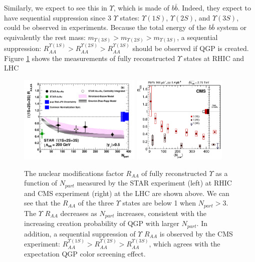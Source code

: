 Similarly, we expect to see this in $\Upsilon$, which is made of $b \bar b$. Indeed, they expect to have sequential suppression since 3 $\Upsilon$ states: $\Upsilon(1S)$,  $\Upsilon(2S)$, and $\Upsilon(3S)$, could be observed in experiments. Because the total energy of the $b \bar b$ system or equivalently the rest mass: $m_{\Upsilon(3S)} > m_{\Upsilon(2S)} > m_{\Upsilon(3S)}$, a sequential suppression: $R_{AA}^{\Upsilon(1S)} > R_{AA}^{\Upsilon(2S)} > R_{AA}^{\Upsilon(3S)}$ should be observed if QGP is created. Figure \ref{UpsilonSupp} shows the measurements of fully reconstructed $\Upsilon$ states at RHIC and LHC \cite{STARUpsilonRef,CMSUpsilonRef}

\begin{figure}[hbtp]
\begin{center}
\includegraphics[width=0.52\textwidth]{Figures/Chapter1/STARUpsilon.png}
\includegraphics[width=0.40\textwidth]{Figures/Chapter1/CMSUpsilon.png}
\caption{The nuclear modifications factor $R_{AA}$ of fully reconstructed $\Upsilon$ as a function of $N_{part}$ measured by the STAR experiment (left) at RHIC and CMS experiment (right) at the LHC are shown above. We can see that the $R_{AA}$ of the three $\Upsilon$ states are below 1 when $N_{part} > 3$. The $\Upsilon$ $R_{AA}$ decreases as $N_{part}$ increases, consistent with the increasing creation probability of QGP with larger $N_{part}$. In addition, a sequential suppression of $\Upsilon$ $R_{AA}$ is observed by the CMS experiment: $R_{AA}^{\Upsilon(1S)} > R_{AA}^{\Upsilon(2S)} > R_{AA}^{\Upsilon(3S)}$, which agrees with the expectation QGP color screening effect.}
\label{UpsilonSupp}
\end{center}
\end{figure} 


